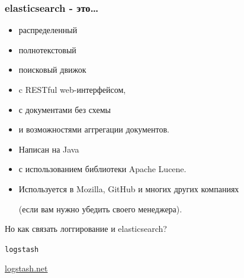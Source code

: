 \documentclass[aspectratio=169]{beamer}
\begin{document}
\begin{frame}
  \frametitle{elasticsearch - это\ldots}

  \begin{itemize}
  \item распределенный
  \item полнотекстовый
  \item поисковый движок
    \pause
  \item c RESTful web-интерфейсом,
  \item с документами без схемы
  \item и возможностями аггрегации документов.
  \end{itemize}

  \pause

  \vspace{0.3cm}
  \begin{itemize}
  \item Написан на Java
  \item с использованием библиотеки Apache Lucene.
  \item Используется в Mozilla, GitHub и многих других компаниях\par(если вам нужно убедить своего менеджера).
  \end{itemize}

  \pause

  \vspace{0.3cm}
  {\color{WGred}
    Но как связать логгирование и elasticsearch?
  }
\end{frame}


\begin{frame}
  \begin{center}
    {\Huge {\tt logstash}} \par
    \url{logstash.net}
  \end{center}
\end{frame}
\end{document}
